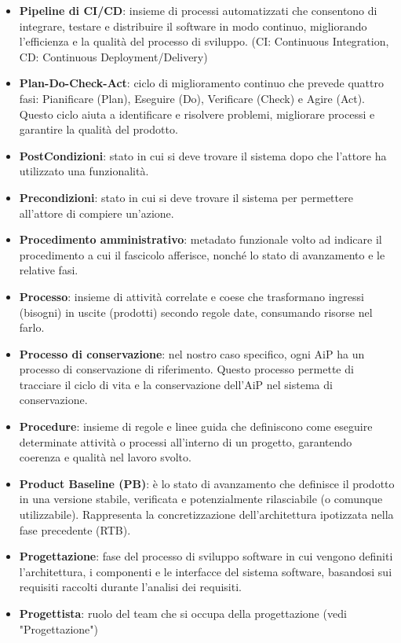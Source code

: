 \documentclass[a4paper,12pt]{article}
\begin{document}
\begin{itemize}
    \item \textbf{Pipeline di CI/CD}: insieme di processi automatizzati che consentono di integrare, testare e distribuire il software in modo continuo, migliorando l'efficienza e la qualità del processo di sviluppo. (CI: Continuous Integration, CD: Continuous Deployment/Delivery)
    \item \textbf{Plan-Do-Check-Act}: ciclo di miglioramento continuo che prevede quattro fasi: Pianificare (Plan), Eseguire (Do), Verificare (Check) e Agire (Act). Questo ciclo aiuta a identificare e risolvere problemi, migliorare processi e garantire la qualità del prodotto.
    \item \textbf{PostCondizioni}: stato in cui si deve trovare il sistema dopo che l'attore ha utilizzato una funzionalità.
    \item \textbf{Precondizioni}: stato in cui si deve trovare il sistema per permettere all'attore di compiere un'azione.
    \item \textbf{Procedimento amministrativo}: metadato funzionale volto ad indicare il procedimento a cui il fascicolo afferisce, nonché lo stato di avanzamento e le relative fasi.
    \item \textbf{Processo}: insieme di attività correlate e coese che trasformano ingressi (bisogni) in uscite (prodotti) secondo regole date, consumando risorse nel farlo.
    \item \textbf{Processo di conservazione}: nel nostro caso specifico, ogni AiP ha un processo di conservazione di riferimento. Questo processo permette di tracciare il ciclo di vita e la conservazione dell'AiP nel sistema di conservazione.
    \item \textbf{Procedure}: insieme di regole e linee guida che definiscono come eseguire determinate attività o processi all'interno di un progetto, garantendo coerenza e qualità nel lavoro svolto.
    \item \textbf{Product Baseline (PB)}: è lo stato di avanzamento che definisce il prodotto in una versione stabile, verificata e potenzialmente rilasciabile (o comunque utilizzabile). Rappresenta la concretizzazione dell'architettura ipotizzata nella fase precedente (RTB).
    \item \textbf{Progettazione}: fase del processo di sviluppo software in cui vengono definiti l'architettura, i componenti e le interfacce del sistema software, basandosi sui requisiti raccolti durante l'analisi dei requisiti.
    \item \textbf{Progettista}: ruolo del team che si occupa della progettazione (vedi "Progettazione")

\end{itemize}
\end{document}
